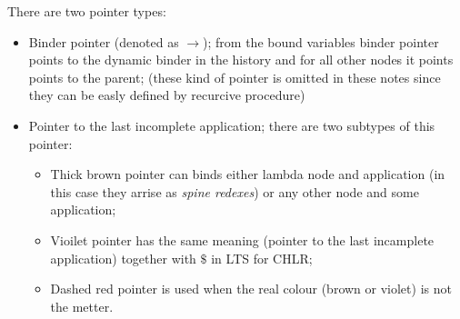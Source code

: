 \documentclass[a4paper, 10pt]{article}
\begin{document}
There are two pointer types:
\begin{itemize}
\item Binder pointer (denoted as {\color{green}$\rightarrow$});
  from the bound variables binder pointer points to the dynamic binder in the history
  and for all other nodes it points points to the parent;
  (these kind of pointer is omitted in these notes since they can
  be easly defined by recurcive procedure)
\item Pointer to the last incomplete application; there are two subtypes
  of this pointer:
  \begin{itemize}
  \item Thick brown pointer can binds either
    lambda node and application (in this case they arrise as \emph{spine redexes})
    or any other node and some application;
  \item Vioilet pointer has the same meaning
    (pointer to the last incamplete application) together with $\$$
    in LTS for CHLR;
  \item Dashed red pointer is used when the real colour
    (brown or violet) is not the metter.    
  \end{itemize}
\end{itemize}
\end{document}

